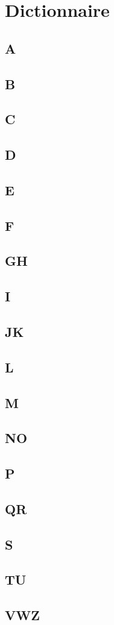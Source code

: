\chapter{Dictionnaire}
\section{A}

\section{B}

\section{C}

\section{D}

\section{E}

\section{F}

\section{GH}

\section{I}

\section{JK}

\section{L}

\section{M}

\section{NO}

\section{P}

\section{QR}

\section{S}

\section{TU}

\section{VWZ}

